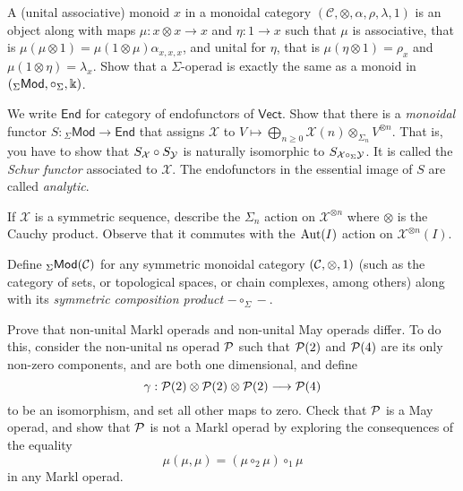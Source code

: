 \begin{question}
A (unital associative) monoid $x$ in a monoidal category 
$(\mathcal C,\otimes,\alpha,\rho,\lambda,1)$ is an object
along with maps $\mu: x\otimes x\to x$ and $\eta : 1
 \longrightarrow x$ such that $\mu$ is associative, 
 that is $\mu (\mu\otimes 1) = \mu(1\otimes \mu)
 \alpha_{x,x,x}$, and unital for
$\eta$, that is $\mu(\eta\otimes 1)=\rho_x$
and $\mu(1\otimes \eta) = \lambda_x$.
Show that a $\Sigma$-operad is exactly the
same as a monoid in $({}_\Sigma\mathsf{Mod},\circ_\Sigma,\Bbbk)$.
\end{question}

\begin{question}
We write $\mathsf{End}$ for
 category of endofunctors of $\mathsf{Vect}$. Show
 that there is a \emph{monoidal}
 functor $S:{}_\Sigma\mathsf{Mod}
 \longrightarrow \mathsf{End}$ that assigns
 $\mathcal{X}$ to $V\longmapsto \bigoplus_{n\geqslant 0} \mathcal{X}(n)\otimes_{\Sigma_n} V^{\otimes n}$.
 That is, 
  you have to show that $S_{\mathcal{X}}\circ
 S_{\mathcal{Y}}$ is naturally isomorphic to $S_{\mathcal{X}\circ_\Sigma \mathcal{Y}}$.
 It is called the \emph{Schur functor} associated
 to $\mathcal{X}$. The endofunctors in the essential
 image of $S$ are called \emph{analytic}.
\end{question}

\begin{question}
	 If $\mathcal{X}$
	 is a symmetric sequence, describe the $\Sigma_n$
	 action on $\mathcal{X}^{\otimes n}$ where
	 $\otimes$ is the Cauchy product. Observe that
	 it commutes with the $\operatorname{Aut}(I)$ action on 
	 $\mathcal{X}^{\otimes n}(I)$.
\end{question}
	 
\begin{question}
Define ${}_\Sigma\mathsf{Mod}(\mathcal{C})$
for any symmetric monoidal category $(\mathcal{C},\otimes,1)$
(such as the category of sets, or topological spaces,
or chain complexes, among others) along with
its \emph{symmetric composition product}
 $-\circ_\Sigma - $.
 \end{question}
 
\begin{question} Prove that non-unital Markl operads
and non-unital May operads differ.
To do this, consider the non-unital ns operad
${\mathcal{P}}$ such that ${\mathcal{P}}(2)$ and ${\mathcal{P}}(4)$
are its only non-zero components, and are
both one dimensional, and define
\[ \gamma : {\mathcal{P}}(2)\otimes {\mathcal{P}}(2)\otimes {\mathcal{P}}(2)
 	\longrightarrow {\mathcal{P}}(4) \]
to be an isomorphism, and set all other maps to zero. 
Check that ${\mathcal{P}}$ is a May operad, and
show that ${\mathcal{P}}$ is not a Markl
operad by exploring the consequences
of the equality
\[ \mu(\mu,\mu) = (\mu \circ_2\mu)\circ_1 \mu \]
in any Markl operad.
\end{question}

